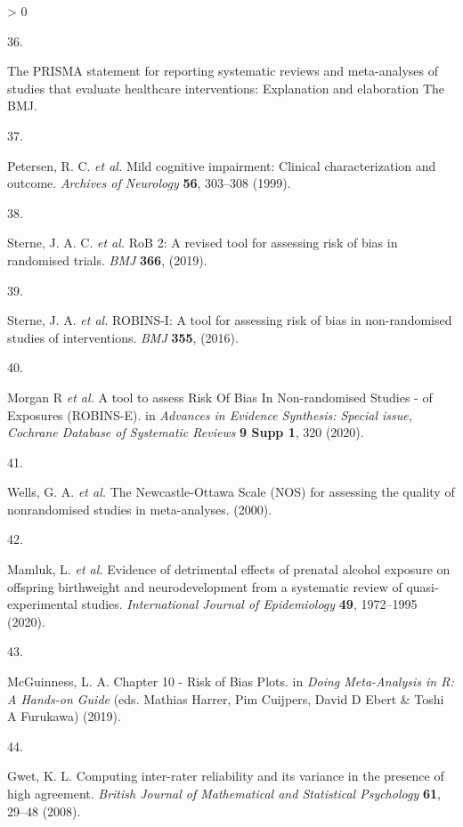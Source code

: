 \documentclass[a4paper, twoside]{templates/ociamthesis}
\newlength{\cslhangindent}
\newlength{\csllabelwidth}
\newenvironment{CSLReferences}[3] %
 {%
  \setlength{\parindent}{0pt}
  \ifodd #1 \everypar{\setlength{\hangindent}{\cslhangindent}}\ignorespaces\fi
  \ifnum #2 > 0
  \setlength{\parskip}{#2\baselineskip}
  \fi
 }%
 {}
\newcommand{\CSLLeftMargin}[1]{\parbox[t]{\maxof{\widthof{#1}}{\csllabelwidth}}{#1}}
\newcommand{\CSLRightInline}[1]{\parbox[t]{\linewidth - \csllabelwidth}{#1}}
\begin{document}
\begin{CSLReferences}{0}{0}
\leavevmode\hypertarget{ref-zotero-766}{}%
\CSLLeftMargin{36. }
\CSLRightInline{The {PRISMA} statement for reporting systematic reviews and meta-analyses of studies that evaluate healthcare interventions: Explanation and elaboration \textbar{} {The BMJ}.}

\leavevmode\hypertarget{ref-petersen1999}{}%
\CSLLeftMargin{37. }
\CSLRightInline{Petersen, R. C. \emph{et al.} Mild cognitive impairment: Clinical characterization and outcome. \emph{Archives of Neurology} \textbf{56}, 303--308 (1999).}

\leavevmode\hypertarget{ref-sterne2019}{}%
\CSLLeftMargin{38. }
\CSLRightInline{Sterne, J. A. C. \emph{et al.} {RoB} 2: A revised tool for assessing risk of bias in randomised trials. \emph{BMJ} \textbf{366}, (2019).}

\leavevmode\hypertarget{ref-sterne2016}{}%
\CSLLeftMargin{39. }
\CSLRightInline{Sterne, J. A. \emph{et al.} {ROBINS}-{I}: A tool for assessing risk of bias in non-randomised studies of interventions. \emph{BMJ} \textbf{355}, (2016).}

\leavevmode\hypertarget{ref-morganr2020}{}%
\CSLLeftMargin{40. }
\CSLRightInline{Morgan R \emph{et al.} A tool to assess {Risk Of Bias In Non}-randomised {Studies} - of {Exposures} ({ROBINS}-{E}). in \emph{Advances in {Evidence Synthesis}: Special issue, {Cochrane Database} of {Systematic Reviews}} \textbf{9 Supp 1}, 320 (2020).}

\leavevmode\hypertarget{ref-wells2000newcastle}{}%
\CSLLeftMargin{41. }
\CSLRightInline{Wells, G. A. \emph{et al.} The {Newcastle}-{Ottawa Scale} ({NOS}) for assessing the quality of nonrandomised studies in meta-analyses. (2000).}

\leavevmode\hypertarget{ref-mamluk2020}{}%
\CSLLeftMargin{42. }
\CSLRightInline{Mamluk, L. \emph{et al.} Evidence of detrimental effects of prenatal alcohol exposure on offspring birthweight and neurodevelopment from a systematic review of quasi-experimental studies. \emph{International Journal of Epidemiology} \textbf{49}, 1972--1995 (2020).}

\leavevmode\hypertarget{ref-mcguinness2019}{}%
\CSLLeftMargin{43. }
\CSLRightInline{McGuinness, L. A. Chapter 10 - {Risk} of {Bias Plots}. in \emph{Doing {Meta}-{Analysis} in {R}: {A Hands}-on {Guide}} (eds. Mathias Harrer, Pim Cuijpers, David D Ebert \& Toshi A Furukawa) (2019).}

\leavevmode\hypertarget{ref-gwet2008}{}%
\CSLLeftMargin{44. }
\CSLRightInline{Gwet, K. L. Computing inter-rater reliability and its variance in the presence of high agreement. \emph{British Journal of Mathematical and Statistical Psychology} \textbf{61}, 29--48 (2008).}


\end{CSLReferences}
\end{document}
